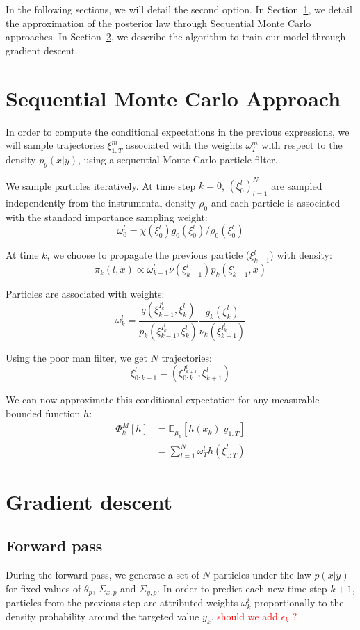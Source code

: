 \documentclass[10pt,a4paper]{report}
\begin{document}
In the following sections, we will detail the second option.
In Section~\ref{sec:smc}, we detail the approximation of the posterior law through Sequential Monte Carlo approaches.
In Section~\ref{sec:gradient_descent}, we describe the algorithm to train our model through gradient descent.


\section{Sequential Monte Carlo Approach}
\label{sec:smc}
In order to compute the conditional expectations in the previous expressions, we will sample trajectories $\xi_{1:T}^m$ associated with the weights $\omega_T^m$ with respect to the density $p_{\theta}(x | y)$, using a sequential Monte Carlo particle filter.

We sample particles iteratively. At time step $k=0$, $(\xi_0^l)_{l=1}^N$ are sampled independently from the instrumental density $\rho_0$ and each particle is associated with the standard importance sampling weight:
$$\omega_0^l=\chi(\xi_0^l) g_0(\xi_0^l) / \rho_0(\xi_0^l)$$

At time $k$, we choose to propagate the previous particle ($\xi_{k-1}^l$) with density:
$$\pi_k(l, x) \propto \omega_{k-1}^l \nu(\xi_{k-1}^l) p_k(\xi_{k-1}^l, x) $$

Particles are associated with weights:
$$\omega_k^l = \frac{q(\xi_{k-1}^{I_k^l}, \xi_k^l)}{p_k(\xi_{k-1}^{I_k^l}, \xi_k^l)} \frac{g_k(\xi_k^l)}{\nu_k(\xi_{k-1}^{I_k^l})}$$

Using the poor man filter, we get $N$ trajectories:
$$\xi_{0:k+1}^{l} = (\xi_{0:k}^{I_{k+1}^l}, \xi_{k+1}^l)$$

We can now approximate this conditional expectation for any measurable bounded function $h$:
\begin{align*}
    \Phi_k^M[h] & = \mathbb{E}_{\hat \mu_p} \left[ h(x_k) | y_{1:T} \right] \\
                & = \sum_{l=1}^N \omega_T^l h(\xi_{0:T}^l)
\end{align*}

\section{Gradient descent}
\label{sec:gradient_descent}

\subsection{Forward pass}
During the forward pass, we generate a set of $N$ particles under the law $p(x|y)$ for fixed values of $\theta_p$, $\Sigma_{x, p}$ and $\Sigma_{y, p}$.
In order to predict each new time step $k+1$, particles from the previous step are attributed weights $\omega_k^i$ proportionally to the density probability around the targeted value $y_k$.
\textcolor{red}{should we add $\epsilon_k$ ?}
\end{document}
